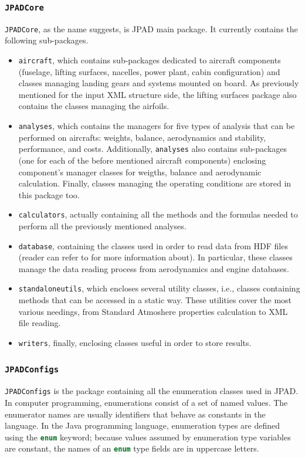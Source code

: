\subsubsection{\texttt{JPADCore}}
\lstinline[language=Java]!JPADCore!, as the name suggests, is \gls{JPAD} main package. It currently contains the following sub-packages.
%
\begin{itemize}
\item \lstinline[language=Java]!aircraft!, which contains sub-packages dedicated to aircraft components (fuselage, lifting surfaces, nacelles, power plant, cabin configuration) and classes managing landing gears and systems mounted on board. As previously mentioned for the input XML structure side, the lifting surfaces package also contains the classes managing the airfoils.
\item \lstinline[language=Java]!analyses!, which contains the managers for five types of analysis that can be performed on aircrafts: weights, balance, aerodynamics and stability, performance, and costs. Additionally, \lstinline[language=Java]!analyses! also contains sub-packages (one for each of the before mentioned aircraft components) enclosing component's manager classes for weigths, balance and aerodynamic calculation. Finally, classes managing the operating conditions are stored in this package too.
\item \lstinline[language=Java]!calculators!, actually containing all the methods and the formulas needed to perform all the previously mentioned analyses.
\item \lstinline[language=Java]!database!, containing the classes used in order to read data from HDF files (reader can refer to \cite{HDFWiki} for more information about). In particular, these classes manage the data reading process from aerodynamics and engine databases.
\item \lstinline[language=Java]!standaloneutils!, which encloses several utility classes, i.e., classes containing methods that can be accessed in a static way. These utilities cover the most various needings, from Standard Atmoshere properties calculation to XML file reading.
\item \lstinline[language=Java]!writers!, finally, enclosing classes useful in order to store results.
\end{itemize}
%

\subsubsection{\texttt{JPADConfigs}}
\lstinline[language=Java]!JPADConfigs! is the package containing all the enumeration classes used in \gls{JPAD}. In computer programming, enumerations consist of a set of named values. The enumerator names are usually identifiers that behave as constants in the language. In the Java programming language, enumeration types are defined using the \lstinline[language=Java]!enum! keyword; because values assumed by enumeration type variables are constant, the names of an \lstinline[language=Java]!enum! type fields are in uppercase letters. \cite{JavaEnum}

